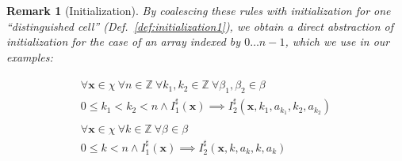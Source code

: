 \documentclass[a4paper]{article}
\newcommand{\ve}[1]{\mathbf{#1}}
\newcommand{\vx}{\ve{x}}
\newcommand{\ZZ}{\mathbb{Z}}
\newcommand{\abstr}[1]{#1^\sharp}
\theoremstyle{definition}
\theoremstyle{plain}
\newtheorem{remark}{Remark}
\newcommand{\rulespacing}{\\[0.4em]}
\begin{document}
\begin{remark}[Initialization]\label{def:initialization2}
By coalescing these rules with initialization for one ``distinguished cell'' (Def.~\ref{def:initialization1}), we obtain a direct abstraction of initialization for the case of an array indexed by $0 \dots n-1$, which we use in our examples:

\begin{align}
\begin{aligned}
\forall \vx \in \chi~ \forall n \in \ZZ~ \forall k_1, k_2\in\ZZ~ \forall \beta_1,\beta_2 \in \beta\\
  0 \leq k_1 < k_2 < n \land
  \abstr{I}_1(\vx) \implies
  \abstr{I}_2(\vx, k_1,  a_{k_1}, k_2, a_{k_2})
\end{aligned}\rulespacing
\begin{aligned}
\forall \vx \in \chi~ \forall k \in\ZZ~ \forall \beta \in \beta\\
  0 \leq k < n \land
  \abstr{I}_1(\vx) \implies  \abstr{I}_2(\vx, k,  a_k, k, a_k)
\end{aligned}
\end{align}
\end{remark}
\end{document}
